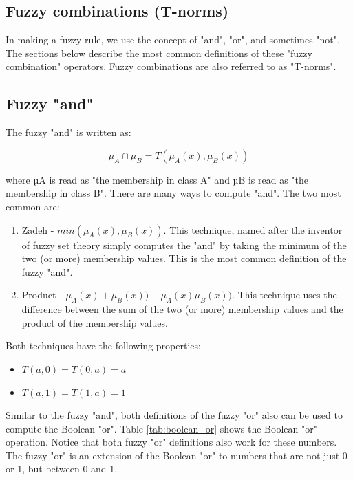 \subsection{Fuzzy combinations (T-norms)}
In making a fuzzy rule, we use the concept of "and", "or", and sometimes "not".
The sections below describe the most common definitions of these
"fuzzy combination" operators. Fuzzy combinations are also referred to as "T-norms".

\subsection{Fuzzy "and"}

The fuzzy "and" is written as:

\begin{equation}\label{eq:prediction}
\displaystyle \mu_A\cap \mu_B = T(\mu_A(x),\mu_ B(x))
\end{equation}

where µA is read as "the membership in class A" and µB is read as "the
membership in class B". There are many ways to compute "and". The two most
common are:

\begin{enumerate}
\item Zadeh - $min(\mu_A(x), \mu_B(x))$. This technique, named after the
inventor of fuzzy set theory simply computes the "and" by taking the minimum of
the two (or more) membership values. This is the most common definition of the
fuzzy "and".
\item Product - $\mu_A(x) + \mu_B(x)) - \mu_A(x) \mu_B(x))$. This technique uses the
difference between the sum of the two (or more) membership values and the
product of the membership values.
\end{enumerate}

Both techniques have the following properties:
\begin{itemize}
\item $T(a,0) = T(0,a) = a$
\item $T(a,1) = T(1,a) = 1$
\end{itemize}
Similar to the fuzzy "and", both
definitions of the fuzzy "or" also can be used to compute the Boolean "or".
Table \ref{tab:boolean_or} shows the Boolean "or" operation. Notice that both fuzzy "or" definitions
also work for these numbers. The fuzzy "or" is an extension of the Boolean "or"
to numbers that are not just 0 or 1, but between 0 and 1.

